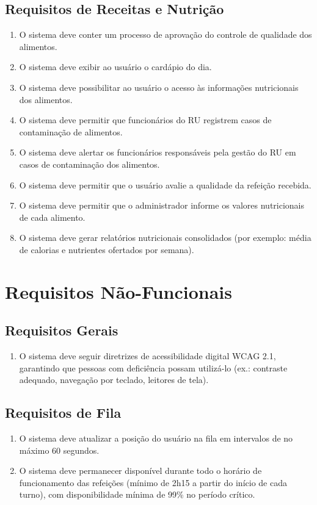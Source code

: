 \documentclass[12pt,a4paper]{article}
\begin{document}
\subsection{Requisitos de Receitas e Nutrição}
\begin{enumerate}[label=\textbf{RF-NUT-\arabic*}, leftmargin=*, align=left]
    \item O sistema deve conter um processo de aprovação do controle de qualidade dos alimentos.
    \item O sistema deve exibir ao usuário o cardápio do dia.
    \item O sistema deve possibilitar ao usuário o acesso às informações nutricionais dos alimentos.
    \item O sistema deve permitir que funcionários do RU registrem casos de contaminação de alimentos.
    \item O sistema deve alertar os funcionários responsáveis pela gestão do RU em casos de contaminação dos alimentos.
    \item O sistema deve permitir que o usuário avalie a qualidade da refeição recebida.
    \item O sistema deve permitir que o administrador informe os valores nutricionais de cada alimento.
    \item O sistema deve gerar relatórios nutricionais consolidados (por exemplo: média de calorias e nutrientes ofertados por semana).
\end{enumerate}

\section{Requisitos Não-Funcionais}

\subsection{Requisitos Gerais}
\begin{enumerate}[label=\textbf{RNF-GEN-\arabic*}, leftmargin=*, align=left]
    \item O sistema deve seguir diretrizes de acessibilidade digital WCAG 2.1, garantindo que pessoas com deficiência possam utilizá-lo (ex.: contraste adequado, navegação por teclado, leitores de tela).
\end{enumerate}

\subsection{Requisitos de Fila}
\begin{enumerate}[label=\textbf{RNF-FIL-\arabic*}, leftmargin=*, align=left]
    \item O sistema deve atualizar a posição do usuário na fila em intervalos de no máximo 60 segundos.
    \item O sistema deve permanecer disponível durante todo o horário de funcionamento das refeições (mínimo de 2h15 a partir do início de cada turno), com disponibilidade mínima de 99\% no período crítico.
\end{enumerate}
\end{document}

